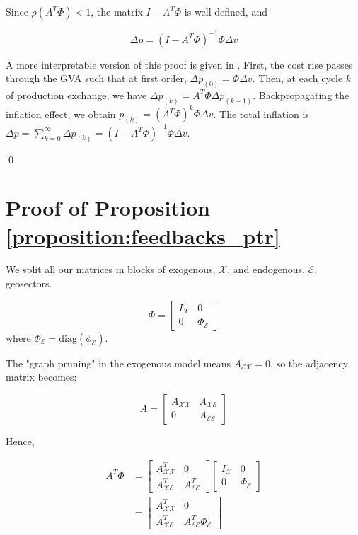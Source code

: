 \documentclass{article}
\begin{document}
\noindent Since $\rho(A^T \Phi) < 1$, the matrix $I - A^T \Phi$ is well-defined, and

\[
\Delta p = (I - A^T \Phi)^{-1} \Phi \Delta v
\]

\noindent A more interpretable version of this proof is given in \cite{desnos2023climate}. First, the cost rise passes through the GVA such that at first order, $\Delta p_{(0)} = \Phi \Delta v$. Then, at each cycle $k$ of production exchange, we have $\Delta p_{(k)}=A^T \Phi \Delta p_{(k-1)}$. Backpropagating the inflation effect, we obtain $p_{(k)}=(A^T \Phi)^k \Phi \Delta v$. The total inflation is $\Delta p=\sum_{k=0}^\infty \Delta p_{(k)} = (I - A^T \Phi)^{-1} \Phi \Delta v$. 

\qed

\section{Proof of Proposition \ref{proposition:feedbacks_ptr}}
\label{app:proof_feedbacks_ptr}

\noindent We split all our matrices in blocks of exogenous, $\mathcal{X}$, and endogenous, $\mathcal{E}$, geosectors. 

\begin{equation*}
    \Phi = \begin{bmatrix}
        I_{\mathcal{X}} & 0 \\
        0 & \Phi_{\mathcal{E}}
    \end{bmatrix}
\end{equation*}
where $\Phi_{\mathcal{E}} = \text{diag}(\phi_{\mathcal{E}})$.

\vspace{0.1cm}

\noindent The "graph pruning" in the exogenous model means $A_{\mathcal{EX}} = 0$, so the adjacency matrix becomes:

\begin{equation*}
    A = \begin{bmatrix}
        A_{\mathcal{XX}} & A_{\mathcal{XE}} \\
        0 & A_{\mathcal{EE}}
    \end{bmatrix}
\end{equation*}

\noindent Hence,

\begin{align*}
    A^T \Phi &= \begin{bmatrix}
        A_{\mathcal{XX}}^T & 0 \\
        A_{\mathcal{XE}}^T & A_{\mathcal{EE}}^T
    \end{bmatrix} \begin{bmatrix}
        I_{\mathcal{X}} & 0 \\
        0 & \Phi_{\mathcal{E}}
    \end{bmatrix} \\
    &= \begin{bmatrix}
        A_{\mathcal{XX}}^T & 0 \\
        A_{\mathcal{XE}}^T & A_{\mathcal{EE}}^T \Phi_{\mathcal{E}}
    \end{bmatrix}
\end{align*}
\end{document}
